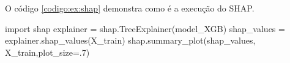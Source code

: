 O código \ref{codigo:ex:shap} demonstra como é a execução do SHAP.
\begin{codigo}[caption={Importação da biblioteca shap e o cálculo dos shap values.}, label={codigo:ex:shap}, language=Python, breaklines=true]
import shap
explainer = shap.TreeExplainer(model_XGB)
shap_values = explainer.shap_values(X_train)
shap.summary_plot(shap_values, X_train,plot_size=.7)
\end{codigo}





